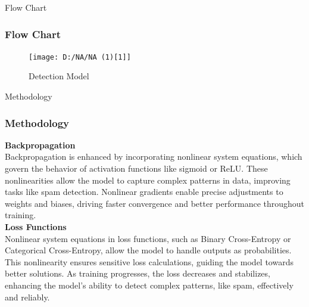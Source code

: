 \documentclass[aspectratio=1610]{beamer}
\begin{document}
\begin{frame}{Flow Chart}
    \frametitle{Flow Chart}
        \begin{figure}
        \centering
        \texttt{[image: D:/NA/NA (1)[1]]}
        \caption{Detection Model}
        \label{fig:enter-label}
    \end{figure}
      
    
\end{frame}

\begin{frame}{Methodology}
    \frametitle{Methodology}
    \textbf{Backpropagation}\\
    \vspace{0.3cm}
    Backpropagation is enhanced by incorporating nonlinear system equations, which govern the behavior of activation functions like sigmoid or ReLU. These nonlinearities allow the model to capture complex patterns in data, improving tasks like spam detection. Nonlinear gradients enable precise adjustments to weights and biases, driving faster convergence and better performance throughout training.\\
    \vspace{0.5cm}
    \textbf{Loss Functions}\\
    \vspace{0.3cm}
    Nonlinear system equations in loss functions, such as Binary Cross-Entropy or Categorical Cross-Entropy, allow the model to handle outputs as probabilities. This nonlinearity ensures sensitive loss calculations, guiding the model towards better solutions. As training progresses, the loss decreases and stabilizes, enhancing the model’s ability to detect complex patterns, like spam, effectively and reliably.

\end{frame}
\end{document}
